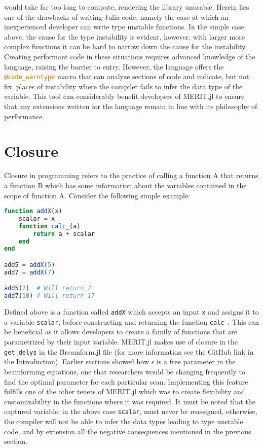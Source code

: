 would take far too long to compute, rendering the library unusable. Herein lies one of the drawbacks of writing Julia
code, namely the ease at which an inexperienced developer can write type unstable functions. In the simple case above,
the cause for the type instability is evident, however, with larger more complex functions it can be hard to narrow down
the cause for the instability. Creating performant code in these situations requires advanced knowledge of the language,
raising the barrier to entry. However, the language offers the \lstinline[language=Julia]{@code_warntype} macro that can
analyze sections of code and indicate, but not fix, places of instability where the compiler fails to infer the data
type of the variable. This tool can considerably benefit developers of MERIT.jl to ensure that any extensions written
for the language remain in line with its philosophy of performance.  

\section{Closure}
Closure in programming refers to the practice of calling a function A that returns a function B which has some
information about the variables contained in the scope of function A. Consider the following simple example:
\begin{lstlisting}[language=Julia]
function addX(x)
    scalar = x
    function calc_(a)
        return a + scalar
    end
end

add5 = addX(5)
add7 = addX(7)

add5(2)  # Will return 7
add7(10) # Will return 17
\end{lstlisting}
Defined above is a function called \lstinline[language=Julia]{addX} which accepts an input \lstinline[language=Julia]{x}
and assigns it to a variable \lstinline[language=Julia]{scalar}, before constructing and returning the function
\lstinline[language=Julia]{calc_}. This can be beneficial as it allows developers to create a family of functions that
are parametrized by their input variable. MERIT.jl makes use of closure in the \lstinline[language=Julia]{get_delys} in
the Breamform.jl file (for more information see the GitHub link in the Introduction). Earlier sections showed how
$\epsilon$ is a free parameter in the beamforming equations, one that researchers would be changing frequently to find
the optimal parameter for each particular scan. Implementing this feature fulfills one of the other tenets of MERIT.jl
which was to create flexibility and customizability in the functions where it was required. It must be noted that the
captured variable, in the above case \lstinline[language=Julia]{scalar}, must never be reassigned, otherwise, the
compiler will not be able to infer the data types leading to type unstable code, and by extension all the negative
consequences mentioned in the previous section.

